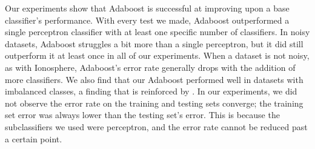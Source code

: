\documentclass{article}
\begin{document}
Our experiments show that Adaboost is successful at improving upon a base classifier's performance. With every test we made, Adaboost outperformed a single perceptron classifier with at least one specific number of classifiers. In noisy datasets, Adaboost struggles a bit more than a single perceptron, but it did still outperform it at least once in all of our experiments. When a dataset is not noisy, as with Ionosphere, Adaboost's error rate generally drops with the addition of more classifiers. We also find that our Adaboost performed well in datasets with imbalanced classes, a finding that is reinforced by \cite{sun-kamel-wang}. In our experiments, we did not observe the error rate on the training and testing sets converge; the training set error was always lower than the testing set's error. This is because the subclassifiers we used were perceptron, and the error rate cannot be reduced past a certain point. \\


 
\end{document}
